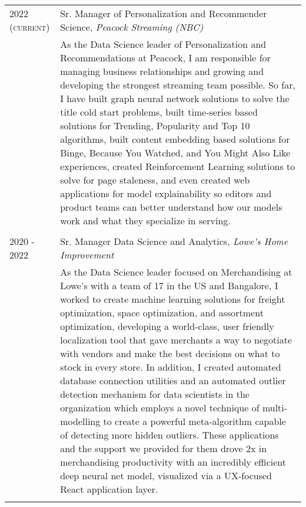 \documentclass[a4paper, 9pt]{article} %
\begin{document}
\begin{tabular}{l|p{14cm}}

\textsc{2022 (current)} & Sr. Manager of Personalization and Recommender Science, \emph{Peacock Streaming (NBC)} \\
& \footnotesize{As the Data Science leader of Personalization and Recommendations at Peacock, I am responsible for managing business relationships and growing and developing the strongest streaming team possible. So far, I have built graph neural network solutions to solve the title cold start problems, built time-series based solutions for Trending, Popularity and Top 10 algorithms, built content embedding based solutions for Binge, Because You Watched, and You Might Also Like experiences, created Reinforcement Learning solutions to solve for page staleness, and even created web applications for model explainability so editors and product teams can better understand how our models work and what they specialize in serving.}\\

\multicolumn{2}{c}{} \\


\textsc{2020 - 2022} & Sr. Manager Data Science and Analytics, \emph{Lowe's Home Improvement} \\
& \footnotesize{As the Data Science leader focused on Merchandising at Lowe’s with a team of 17 in the US and Bangalore, I worked to create machine learning solutions for freight optimization, space optimization, and assortment optimization, developing a world-class, user friendly localization tool that gave merchants a way to negotiate with vendors and make the best decisions on what to stock in every store. In addition, I created automated database connection utilities and an automated outlier detection mechanism for data scientists in the organization which employs a novel technique of multi-modelling to create a powerful meta-algorithm capable of detecting more hidden outliers. These applications and the support we provided for them drove 2x in merchandising productivity with an incredibly efficient deep neural net model, visualized via a UX-focused React application layer.}\\

\multicolumn{2}{c}{} \\



\end{tabular}
\end{document}
